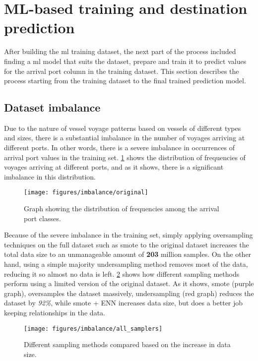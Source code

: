 \section{ML-based training and destination prediction}

After building the \acrfull{ml} training dataset, the next part of the process included finding a \acrshort{ml} model that suits the dataset, prepare and train it to predict values for the arrival port column in the training dataset. This section describes the process starting from the training dataset to the final trained prediction model.

\subsection{Dataset imbalance}
\label{sec:dataset_imbalance}

Due to the nature of vessel voyage patterns based on vessels of different types and sizes, there is a substantial imbalance in the number of voyages arriving at different ports. In other words, there is a severe imbalance in occurrences of arrival port values in the training set. \cref{fig:data_imbalance} shows the distribution of frequencies of voyages arriving at different ports, and as it shows, there is a significant imbalance in this distribution.

\begin{figure}[htbp]
    \centering
    \texttt{[image: figures/imbalance/original]}
    \caption{Graph showing the distribution of frequencies among the arrival port classes.}
    \label{fig:data_imbalance}
\end{figure}

Because of the severe imbalance in the training set, simply applying oversampling techniques on the full dataset such as \acrshort{smote} \parencite{Chawla2002} to the original dataset increases the total data size to an unmanageable amount of \textbf{203} million samples. On the other hand, using a simple majority undersampling method removes most of the data, reducing it so almost no data is left. \cref{fig:all_samplers} shows how different sampling methods perform using a limited version of the original dataset. As it shows, \acrshort{smote} (purple graph), oversamples the dataset massively, undersampling (red graph) reduces the dataset by \textit{92\%}, while \acrshort{smote} + ENN increases data size, but does a better job keeping relationships in the data.

\begin{figure}[htbp]
    \centering
    \texttt{[image: figures/imbalance/all\_samplers]}
    \caption{Different sampling methods compared based on the increase in data size.}
    \label{fig:all_samplers}
\end{figure}

